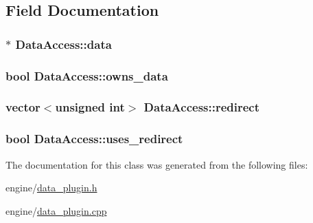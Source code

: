 \subsection{Field Documentation}
\hypertarget{classDataAccess_a37987750a9f946993ddad2245a8c5c54}{
\subsubsection[{data}]{$\ast$ {\bf DataAccess::data}}}
\label{classDataAccess_a37987750a9f946993ddad2245a8c5c54}
\hypertarget{classDataAccess_a227068cc74d5c6d3f001d32ebf24a06e}{
\subsubsection[{owns\_\-data}]{\setlength{\rightskip}{0pt plus 5cm}bool {\bf DataAccess::owns\_\-data}}}
\label{classDataAccess_a227068cc74d5c6d3f001d32ebf24a06e}
\hypertarget{classDataAccess_a642900c2d22f2b850213d46fe819206c}{
\subsubsection[{redirect}]{\setlength{\rightskip}{0pt plus 5cm}vector$<$unsigned int$>$ {\bf DataAccess::redirect}}}
\label{classDataAccess_a642900c2d22f2b850213d46fe819206c}
\hypertarget{classDataAccess_ac49207f016cee4af4c245c8c7fd5fb60}{
\subsubsection[{uses\_\-redirect}]{\setlength{\rightskip}{0pt plus 5cm}bool {\bf DataAccess::uses\_\-redirect}}}
\label{classDataAccess_ac49207f016cee4af4c245c8c7fd5fb60}


The documentation for this class was generated from the following files:\begin{DoxyCompactItemize}
\item 
engine/\hyperlink{data__plugin_8h}{data\_\-plugin.h}\item 
engine/\hyperlink{data__plugin_8cpp}{data\_\-plugin.cpp}\end{DoxyCompactItemize}
